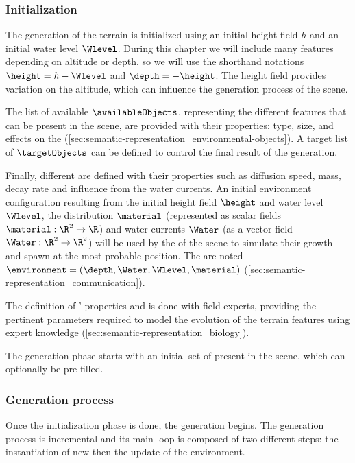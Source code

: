 \subsubsection{Initialization}

The generation of the terrain is initialized using an initial height field $h$ and an initial water level $\Wlevel$. 
During this chapter we will include many features depending on altitude or depth, so we will use the shorthand notations $\height = h - \Wlevel$ and $\depth = -\height$. The height field provides variation on the altitude, which can influence the generation process of the scene.

The list of available  $\availableObjects$, representing the different features that can be present in the scene, are provided with their properties: type, size,  and effects on the  (\cref{sec:semantic-representation_environmental-objects}). A target list of  $\targetObjects$ can be defined to control the final result of the generation.

Finally, different  are defined with their properties such as diffusion speed, mass, decay rate and influence from the water currents. An initial environment configuration resulting from the initial height field $\height$ and water level $\Wlevel$, the  distribution $\material$ (represented as scalar fields $\material: \R^2 \to \R$) and water currents $\Water$ (as a vector field $\Water: \R^2 \to \R^2$) will be used by the  of the scene to simulate their growth and spawn at the most probable position. The  are noted $\environment = (\depth, \Water, \Wlevel, \material)$ (\cref{sec:semantic-representation_communication}).

The definition of ' properties and  is done with field experts, providing the pertinent parameters required to model the evolution of the terrain features using expert knowledge (\cref{sec:semantic-representation_biology}). 

The generation phase starts with an initial set of  present in the scene, which can optionally be pre-filled.

\subsubsection{Generation process} 

Once the initialization phase is done, the generation begins. The generation process is incremental and its main loop is composed of two different steps: the instantiation of new  then the update of the environment.


